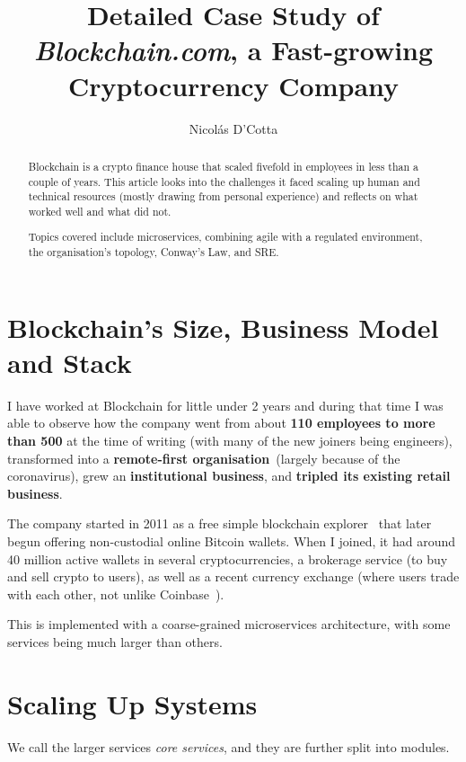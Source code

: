\documentclass[conference]{IEEEtran}
\title{Detailed Case Study of \emph{Blockchain.com}, a Fast-growing Cryptocurrency Company}
\begin{document}
    \author{Nicolás D'Cotta}

    \maketitle

    \begin{abstract}
        Blockchain is a crypto finance house that scaled fivefold in
        employees in less than a couple of years.
        This article looks into the challenges it faced scaling up human and
        technical resources (mostly drawing from personal experience) and reflects
        on what worked well and what did not.

        Topics covered include microservices, combining agile with a regulated environment, the organisation's topology, Conway's Law, and SRE.
    \end{abstract}


    \section{Blockchain's Size, Business Model and Stack}\label{sec:business}

    I have worked at Blockchain for little under 2 years and during that time I was able to observe
    how the company went from about \textbf{110 employees to more than 500} at the time of writing (with many
    of the new joiners being engineers), transformed into a \textbf{remote-first organisation}~(largely because
    of the coronavirus), grew an \textbf{institutional business}, and \textbf{tripled its existing retail business}.

    The company started in 2011 as a free simple blockchain explorer~\cite{bcAbout} that later
    begun offering non-custodial online Bitcoin wallets.
    When I joined, it had around 40 million active wallets in several cryptocurrencies,
    a brokerage service (to buy and sell crypto to users), as well as a recent currency
    exchange (where users trade with each other, not unlike Coinbase~\cite{coinbasePro}).

    This is implemented with a coarse-grained microservices architecture, with some services
    being much larger than others.


    \section{Scaling Up Systems}
    We call the larger services \emph{core services}, and they are further split into modules.
\end{document}
